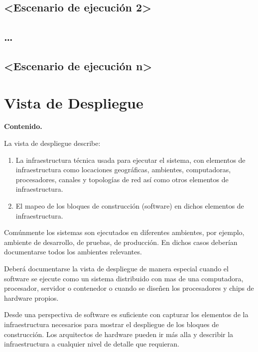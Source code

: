 \documentclass[]{article}
\begin{document}
\hypertarget{__escenario_de_ejecuci_n_2}{%
\subsection{\textless{}Escenario de ejecución
2\textgreater{}}\label{__escenario_de_ejecuci_n_2}}

\hypertarget{_}{%
\subsection{\ldots{}}\label{_}}

\hypertarget{__escenario_de_ejecuci_n_n}{%
\subsection{\textless{}Escenario de ejecución
n\textgreater{}}\label{__escenario_de_ejecuci_n_n}}

\hypertarget{section-deployment-view}{%
\section{Vista de Despliegue}\label{section-deployment-view}}

\textbf{Contenido.}

La vista de despliegue describe:

\begin{enumerate}
\def\labelenumi{\arabic{enumi}.}
\item
  La infraestructura técnica usada para ejecutar el sistema, con
  elementos de infraestructura como locaciones geográficas, ambientes,
  computadoras, procesadores, canales y topologías de red así como otros
  elementos de infraestructura.
\item
  El mapeo de los bloques de construcción (software) en dichos elementos
  de infraestructura.
\end{enumerate}

Comúnmente los sistemas son ejecutados en diferentes ambientes, por
ejemplo, ambiente de desarrollo, de pruebas, de producción. En dichos
casos deberían documentarse todos los ambientes relevantes.

Deberá documentarse la vista de despliegue de manera especial cuando el
software se ejecute como un sistema distribuido con mas de una
computadora, procesador, servidor o contenedor o cuando se diseñen los
procesadores y chips de hardware propios.

Desde una perspectiva de software es suficiente con capturar los
elementos de la infraestructura necesarios para mostrar el despliegue de
los bloques de construcción. Los arquitectos de hardware pueden ir más
alla y describir la infraestructura a cualquier nivel de detalle que
requieran.
\end{document}
